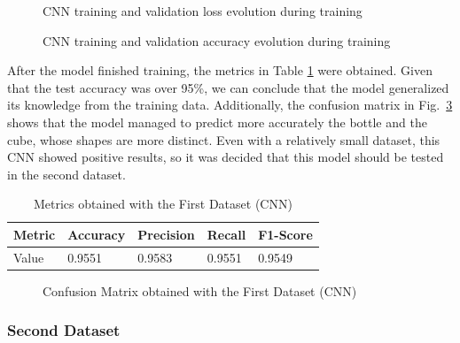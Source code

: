 \begin{figure}[H]
    \centering
    {\fontsize{10}{12}\selectfont}
    \caption[CNN training and validation loss evolution during training]{CNN training and validation loss evolution during training}
    \label{fig:cnn_dataset1_loss}
\end{figure}

\begin{figure}[H]
    \centering
    {\fontsize{10}{12}\selectfont}
    \caption[CNN training and validation accuracy evolution during training]{CNN training and validation accuracy evolution during training}
    \label{fig:cnn_dataset1_acc}
\end{figure}

After the model finished training, the metrics in Table \ref{table:cnn_dataset1_results} were obtained. Given that the test accuracy was over 95\%, we can conclude that the model generalized its knowledge from the training data. Additionally, the confusion matrix in Fig.~\ref{fig:cnn_dataset1_conf_matrix} shows that the model managed to predict more accurately the bottle and the cube, whose shapes are more distinct. Even with a relatively small dataset, this CNN showed positive results, so it was decided that this model should be tested in the second dataset.

\begin{table}[H]
    \centering
    \caption{Metrics obtained with the First Dataset (CNN)}
    \label{table:cnn_dataset1_results}
    \begin{tabular}{|l|l|l|l|l|}
        \hline
        Metric & Accuracy & Precision & Recall & F1-Score \\
        \hline
        Value & 0.9551 & 0.9583 & 0.9551 & 0.9549 \\
        \hline
    \end{tabular}
\end{table}

\begin{figure}[H]
    \centering
    {\fontsize{10}{12}\selectfont}
    \caption[Confusion Matrix obtained with the First Dataset (CNN)]{Confusion Matrix obtained with the First Dataset (CNN)}
    \label{fig:cnn_dataset1_conf_matrix}
\end{figure}

\subsubsection{Second Dataset}

